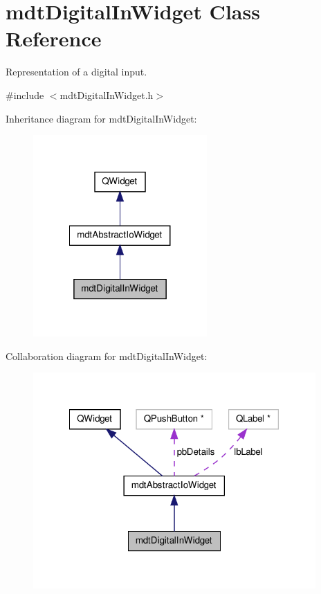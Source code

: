 \hypertarget{classmdt_digital_in_widget}{\section{mdt\-Digital\-In\-Widget Class Reference}
\label{classmdt_digital_in_widget}
}


Representation of a digital input.  




{\ttfamily \#include $<$mdt\-Digital\-In\-Widget.\-h$>$}



Inheritance diagram for mdt\-Digital\-In\-Widget\-:
\nopagebreak
\begin{figure}[H]
\begin{center}
\leavevmode
\includegraphics[width=188pt]{classmdt_digital_in_widget__inherit__graph}
\end{center}
\end{figure}


Collaboration diagram for mdt\-Digital\-In\-Widget\-:
\nopagebreak
\begin{figure}[H]
\begin{center}
\leavevmode
\includegraphics[width=306pt]{classmdt_digital_in_widget__coll__graph}
\end{center}
\end{figure}
